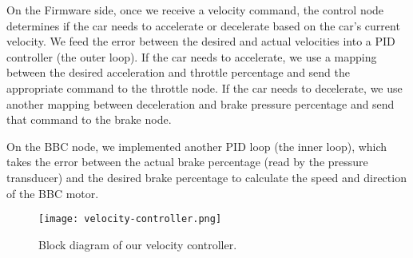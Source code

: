 On the Firmware side, once we receive a velocity command, the control
node determines if the car needs to accelerate or decelerate based on
the car’s current velocity. We feed the error between the desired and
actual velocities into a PID controller (the outer loop). If the car
needs to accelerate, we use a mapping between the desired acceleration
and throttle percentage and send the appropriate command to the
throttle node. If the car needs to decelerate, we use another mapping
between deceleration and brake pressure percentage and send that
command to the brake node.

On the BBC node, we implemented another PID loop (the inner loop),
which takes the error between the actual brake percentage (read by the
pressure transducer) and the desired brake percentage to calculate the
speed and direction of the BBC motor.

\begin{figure}[ht!]
  \centering
  \texttt{[image: velocity-controller.png]}
  \caption{Block diagram of our velocity controller.}
\end{figure}
